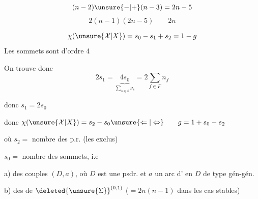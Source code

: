 \[
(n-2)\unsure{-|+}(n-3)=2n-5
\]
\[2(n-1)(2n-5)\qquad2n\]

\[
\chi(\unsure{\mathcal X|X})=s_0-s_1+s_2=1-g
\]
Les sommets sont d'ordre 4

On trouve donc
\[
2s_1=\underbrace{4s_0}_{\sum_{s\in S}\nu_s}=2\sum_{f\in F}n_f
\]

donc $s_1=2s_0$

donc $\chi(\unsure{\mathcal X|X})=s_2-s_0\unsure{\Leftarrow|\Leftrightarrow}\qquad g=1+s_0-s_2$

où $s_2=$ nombre des p.r. (les  exclus)

$s_0=$ nombre des sommets, i.e 

a) des couples $(D,a)$, où $D$ est une psdr. et $a$ un arc d'  en $D$ de type gén-gén.

b) des   de $\deleted{\unsure{\Sigma}}^{(0,1)}$  ($=2n(n-1)$ dans les cas stables)

